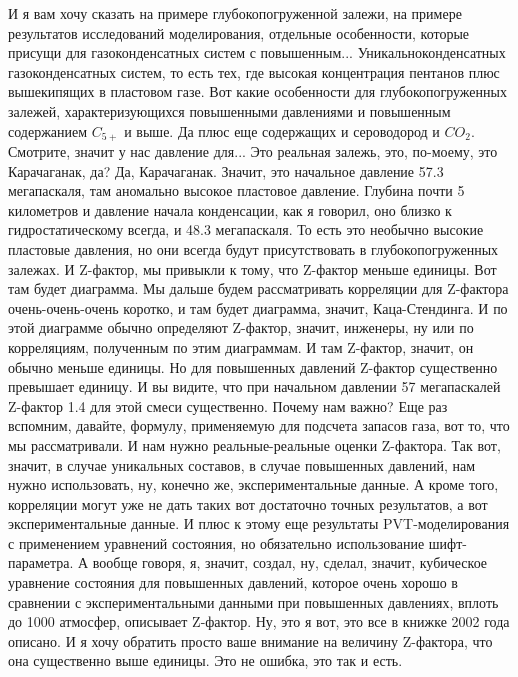 \documentclass[main.tex]{subfiles}
\begin{document}
И я вам хочу сказать на примере глубокопогруженной залежи, на примере результатов исследований моделирования, отдельные особенности, которые присущи для газоконденсатных систем с повышенным...
Уникальноконденсатных газоконденсатных систем, то есть тех, где высокая концентрация пентанов плюс вышекипящих в пластовом газе.
Вот какие особенности для глубокопогруженных залежей, характеризующихся повышенными давлениями и повышенным содержанием $C_{5+}$ и выше.
Да плюс еще содержащих и сероводород и $CO_2$.
Смотрите, значит у нас давление для... Это реальная залежь, это, по-моему, это Карачаганак, да?
Да, Карачаганак.
Значит, это начальное давление 57.3 мегапаскаля, там аномально высокое пластовое давление.
Глубина почти 5 километров и давление начала конденсации, как я говорил, оно близко к гидростатическому всегда, и 48.3 мегапаскаля.
То есть это необычно высокие пластовые давления, но они всегда будут присутствовать в глубокопогруженных залежах.
И Z-фактор, мы привыкли к тому, что Z-фактор меньше единицы.
Вот там будет диаграмма.
Мы дальше будем рассматривать корреляции для Z-фактора очень-очень-очень коротко, и там будет диаграмма, значит, Каца-Стендинга.
И по этой диаграмме обычно определяют Z-фактор, значит, инженеры, ну или по корреляциям, полученным по этим диаграммам.
И там Z-фактор, значит, он обычно меньше единицы.
Но для повышенных давлений Z-фактор существенно превышает единицу.
И вы видите, что при начальном давлении 57 мегапаскалей Z-фактор 1.4 для этой смеси существенно.
Почему нам важно?
Еще раз вспомним, давайте, формулу, применяемую для подсчета запасов газа, вот то, что мы рассматривали.
И нам нужно реальные-реальные оценки Z-фактора.
Так вот, значит, в случае уникальных составов, в случае повышенных давлений, нам нужно использовать, ну, конечно же, экспериментальные данные.
А кроме того, корреляции могут уже не дать таких вот достаточно точных результатов, а вот экспериментальные данные.
И плюс к этому еще результаты PVT-моделирования с применением уравнений состояния, но обязательно использование шифт-параметра.
А вообще говоря, я, значит, создал, ну, сделал, значит, кубическое уравнение состояния для повышенных давлений, которое очень хорошо в сравнении с экспериментальными данными при повышенных давлениях, вплоть до 1000 атмосфер, описывает Z-фактор.
Ну, это я вот, это все в книжке 2002 года описано.
И я хочу обратить просто ваше внимание на величину Z-фактора, что она существенно выше единицы.
Это не ошибка, это так и есть.
\end{document}
